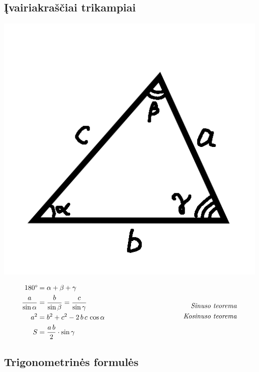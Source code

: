 \documentclass[fleqn]{article} %
\begin{document}
\clearpage
\subsection{Įvairiakraščiai trikampiai}

\includegraphics[scale=0.5]{icocele_triangle.png}

\begin{equation*}
    \begin{aligned}[c]
        180\degree &= \alpha + \beta + \gamma \\
        \frac{a}{\sin \alpha} &= \frac{b}{\sin \beta} = \frac{c}{\sin \gamma} \\
        a^2 &= b^2 + c^2 - 2\, b\, c\,\cos \alpha \\
        S &= \frac{a\,b}{2} \cdot \sin \gamma
    \end{aligned}
    \hspace{40mm}
    \begin{aligned}[c]
        \textit{Sinuso\ teorema} \\
        \textit{Kosinuso\ teorema} \\
    \end{aligned}
\end{equation*}


\subsection{Trigonometrinės formulės}
\end{document}

